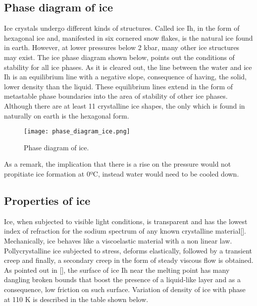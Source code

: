\subsection{Phase diagram of ice}
Ice crystals undergo different kinds of structures. Called ice Ih, in the form of hexagonal ice and, manifested in six cornered snow flakes, is the natural ice found in earth. However, at lower pressures below 2 kbar, many other ice structures may exist.
\newline
The ice phase diagram shown below, points out the conditions of stability for all ice phases. As it is cleared out, the line between the water and ice Ih is an equilibrium line with a negative slope, consequence of having, the solid, lower density than the liquid. These equilibrium lines extend in the form of metastable phase boundaries into the area of stability of other ice phases.
Although there are at least 11 crystalline ice shapes, the only which is found in naturally on earth is the hexagonal form. 
\begin{figure}[h!]
	\centering
	\texttt{[image: phase\_diagram\_ice.png]}
	\caption{Phase diagram of ice.} 
	\label{1.d}
\end{figure}
\newline
As a remark, the implication that there is a rise on the pressure would not propitiate ice formation at 0ºC, instead water would need to be cooled down.
\subsection{Properties of ice}
Ice, when subjected to visible light conditions, is transparent and has the lowest index of refraction for the sodium spectrum of any known crystalline material[\cite{akyurt_zaki_habeebullah_2002}].
\newline
Mechanically, ice behaves like a viscoelastic material with a non linear law. Pollycrystalline ice subjected to stress, deforms elastically, followed by a transient creep and finally, a secondary creep in the form of steady viscous flow is obtained.
\newline
As pointed out in [\cite{akyurt_zaki_habeebullah_2002}], the surface of ice Ih near the melting point has many dangling broken bounds that boost the presence of a liquid-like layer and as a consequence, low friction on such surface. Variation of density of ice with phase at 110 K is described in the table shown below.

